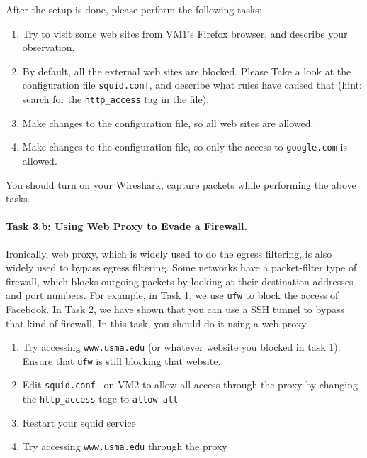 After the setup is done, please perform the following tasks:
\begin{enumerate}
\item Try to visit some web sites from VM1's
Firefox browser, and describe your observation. 

\item By default, all the external web sites are blocked. 
Please Take a look at the configuration file
{\tt squid.conf}, and describe what rules have caused that (hint: 
search for the {\tt http\_access} tag in the file).

\item Make changes to the configuration file, so 
all web sites are allowed. 

\item Make changes to the configuration file, so only
the access to {\tt google.com} is allowed. 
\end{enumerate}

You should turn on your Wireshark, capture packets while 
performing the above tasks. \\


\paragraph{Task 3.b: Using Web Proxy to Evade a Firewall.}
Ironically, web proxy, which is widely used to do the egress 
filtering, is also widely used to bypass egress filtering.
Some networks have a packet-filter type of firewall, which 
blocks outgoing packets by looking at their destination
addresses and port numbers. For example, in Task 1,
we use {\tt ufw} to block the access of Facebook. 
In Task 2, we have shown that you can use a SSH tunnel to 
bypass that kind of firewall. In this task, 
you should do it using a web proxy.

\begin{enumerate}
\item Try accessing {\tt www.usma.edu} (or whatever website you blocked in task 1). Ensure that {\tt ufw} is still blocking that website.
\item Edit {\tt squid.conf } on VM2 to allow all access through the proxy by changing the {\tt http\_access} tage to {\tt allow all}
\item Restart your squid service
\item Try accessing {\tt www.usma.edu} through the proxy
\end{enumerate}

